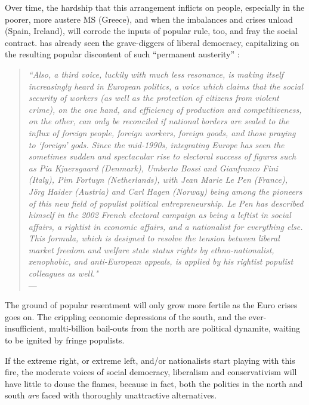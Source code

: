 \documentclass[11pt,a4paper,oneside,openright]{article}
\begin{document}
Over time, the hardship that this arrangement inflicts on people, especially in the poorer, more austere \gls{MS} (Greece), and when the imbalances and crises unload (Spain, Ireland), will corrode the inputs of popular rule, too, and fray the social contract. 
\citeauthor{Offe2003} has already seen the grave-diggers of liberal democracy, capitalizing on the resulting popular discontent of such ``permanent austerity'' \citep{Streeck2010c}: 
\begin{quote}
	\emph{``Also, a third voice, luckily with much less resonance, is making itself increasingly heard in European politics, a voice which claims that the social security of workers (as well as the protection of citizens from violent crime), on the one hand, and efficiency of production and competitiveness, on the other, can only be reconciled if national borders are sealed to the influx of foreign people, foreign workers, foreign goods, and those praying to `foreign' gods. 
	Since the mid-1990s, integrating Europe has seen the sometimes sudden and spectacular rise to electoral success of figures such as Pia Kjaersgaard (Denmark), Umberto Bossi and Gianfranco Fini (Italy), Pim Fortuyn (Netherlands), with Jean Marie Le Pen (France), J\"{o}rg Haider (Austria) and Carl Hagen (Norway) being among the pioneers of this new field of populist political entrepreneurship. 
	Le Pen has described himself in the 2002 French electoral campaign as being a leftist in social affairs, a rightist in economic affairs, and a nationalist for everything else. 
	This formula, which is designed to resolve the tension between liberal market freedom and welfare state status rights by ethno-nationalist, xenophobic, and anti-European appeals, is applied by his rightist populist colleagues as well."}\\
	--- \citep[454]{Offe2003}
\end{quote}

The ground of popular resentment will only grow more fertile as the Euro crises goes on. 
The crippling economic depressions of the south, and the ever-insufficient, multi-billion bail-outs from the north are political dynamite, waiting to be ignited by fringe populists. 


If the extreme right, or extreme left, and/or nationalists start playing with this fire, the moderate voices of social democracy, liberalism and conservativism will have little to douse the flames, because in fact, both the polities in the north and south \emph{are} faced with thoroughly unattractive alternatives.
\end{document}
